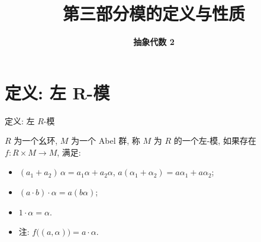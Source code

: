 \everymath{\displaystyle}



\title[第三部分\\
模的定义与性质]{\texorpdfstring{\LARGE \bfseries 第三部分\quad 模的定义与性质}{第三部分 模的定义与性质}}
\author[抽象代数 2]{\Large \bfseries 抽象代数 2}
\date{}





\begin{frame}

\titlepage %

\end{frame}


\section[定义]{定义: 左 R-模}


\begin{frame}{定义: 左 $R$-模}

\begin{Def}[左 $R$-模]
$R$ 为一个幺环, $M$ 为一个 Abel 群, 称 $M$ 为 $R$ 的一个左-模, 如果存在
$f: R \times M \to M$, 满足:
\begin{itemize}
\item[(i)] $(a_1 + a_2)\,\alpha = a_1 \alpha + a_2 \alpha$,
  \qquad $a(\alpha_1 + \alpha_2) = a \alpha_1 + a \alpha_2$;
\item[(ii)] $(a \cdot b) \cdot \alpha = a (b \alpha)$;
\item[(iii)] $1 \cdot \alpha = \alpha$.
\end{itemize}
\end{Def}

\begin{itemize}
\item 注: $f\big( (a, \alpha) \big) = a \cdot \alpha$.
\end{itemize}

\end{frame}


